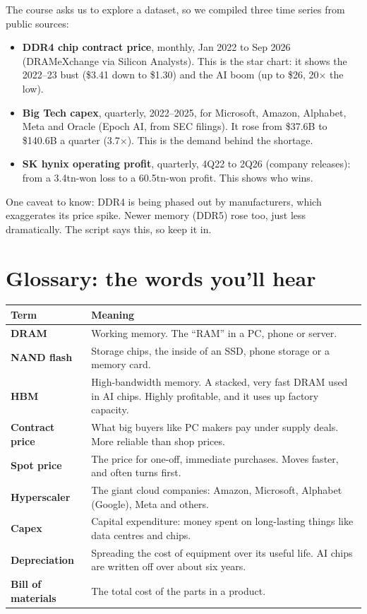 \documentclass[11pt]{article}
\begin{document}
The course asks us to explore a dataset, so we compiled three time series from public sources:
\begin{itemize}
  \item \textbf{DDR4 chip contract price}, monthly, Jan 2022 to Sep 2026 (DRAMeXchange via Silicon Analysts). This is the star chart: it shows the 2022--23 bust (\$3.41 down to \$1.30) and the AI boom (up to \$26, 20$\times$ the low).
  \item \textbf{Big Tech capex}, quarterly, 2022--2025, for Microsoft, Amazon, Alphabet, Meta and Oracle (Epoch AI, from SEC filings). It rose from \$37.6B to \$140.6B a quarter (3.7$\times$). This is the demand behind the shortage.
  \item \textbf{SK hynix operating profit}, quarterly, 4Q22 to 2Q26 (company releases): from a 3.4tn-won loss to a 60.5tn-won profit. This shows who wins.
\end{itemize}
One caveat to know: DDR4 is being phased out by manufacturers, which exaggerates its price spike. Newer memory (DDR5) rose too, just less dramatically. The script says this, so keep it in.

\section*{Glossary: the words you'll hear}

\begin{tabularx}{\linewidth}{@{}>{\bfseries}p{3.2cm}X@{}}
\toprule
\textnormal{\textbf{Term}} & \textbf{Meaning} \\
\midrule
DRAM & Working memory. The ``RAM'' in a PC, phone or server. \\
NAND flash & Storage chips, the inside of an SSD, phone storage or a memory card. \\
HBM & High-bandwidth memory. A stacked, very fast DRAM used in AI chips. Highly profitable, and it uses up factory capacity. \\
Contract price & What big buyers like PC makers pay under supply deals. More reliable than shop prices. \\
Spot price & The price for one-off, immediate purchases. Moves faster, and often turns first. \\
Hyperscaler & The giant cloud companies: Amazon, Microsoft, Alphabet (Google), Meta and others. \\
Capex & Capital expenditure: money spent on long-lasting things like data centres and chips. \\
Depreciation & Spreading the cost of equipment over its useful life. AI chips are written off over about six years. \\
Bill of materials & The total cost of the parts in a product. \\
\bottomrule
\end{tabularx}
\end{document}
